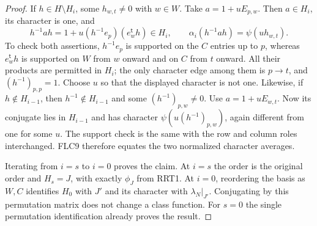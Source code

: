 \documentclass[11pt,a4paper]{article}
\numberwithin{equation}{section}
\theoremstyle{remark}\newtheorem{remark}[theorem]{Remark}
\begin{document}
\begin{proof}
If $h\in H\setminus H_i$, some $h_{w,t}\ne0$ with $w\in W$.
Take $a=1+uE_{p,w}$.  Then $a\in H_i$, its character is one,
and
\[
 h^{-1}ah=1+u(h^{-1}e_p)(e_w^{\mathsf t}h)\in H_i,
 \qquad \alpha_i(h^{-1}ah)=\psi(u h_{w,t}).
\]
To check both assertions, $h^{-1}e_p$ is supported on the
$C$ entries up to $p$, whereas $e_w^{\mathsf t}h$ is supported
on $W$ from $w$ onward and on $C$ from $t$ onward.  All their
products are permitted in $H_i$; the only character edge
among them is $p\to t$, and $(h^{-1})_{p,p}=1$.
Choose $u$ so that the displayed character is not one.
Likewise, if $h\notin H_{i-1}$, then $h^{-1}\notin H_{i-1}$
and some $(h^{-1})_{p,w}\ne0$.  Use $a=1+uE_{w,t}$.
Now its conjugate lies in $H_{i-1}$ and has character
$\psi(u(h^{-1})_{p,w})$, again different from one for some $u$.
The support check is the same with the row and column roles
interchanged.  FLC9 therefore equates the two normalized
character averages.

Iterating from $i=s$ to $i=0$ proves the claim.  At $i=s$ the
order is the original order and $H_s=J$, with exactly
$\phi_J$ from RRT1.  At $i=0$, reordering the basis as $W,C$
identifies $H_0$ with $J'$ and its character with
$\lambda_N|_{J'}$.  Conjugating by this permutation matrix
does not change a class function.  For $s=0$ the single
permutation identification already proves the result.
\end{proof}

\end{document}
